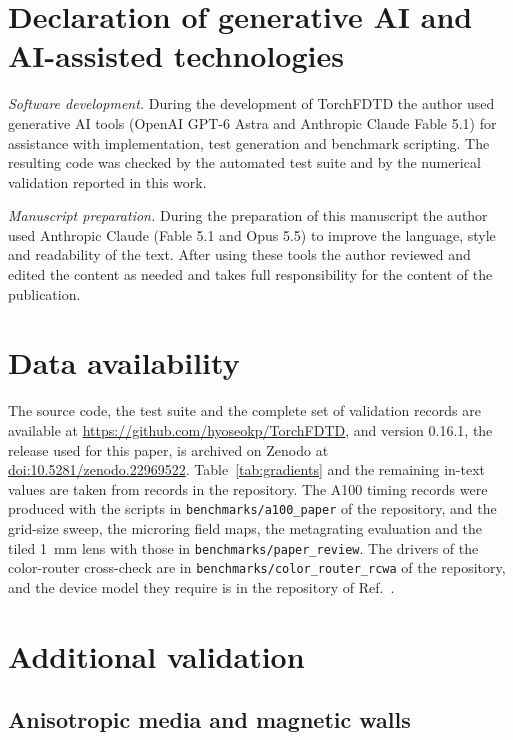 \documentclass[11pt,a4paper]{article}
\newcommand{\code}[1]{{\small\nolinkurl{#1}}}
\begin{document}
\section*{Declaration of generative AI and AI-assisted technologies}

\textit{Software development.} During the development of TorchFDTD the author used generative AI tools (OpenAI GPT-6 Astra and Anthropic Claude Fable 5.1) for assistance with implementation, test generation and benchmark scripting. The resulting code was checked by the automated test suite and by the numerical validation reported in this work.

\textit{Manuscript preparation.} During the preparation of this manuscript the author used Anthropic Claude (Fable 5.1 and Opus 5.5) to improve the language, style and readability of the text. After using these tools the author reviewed and edited the content as needed and takes full responsibility for the content of the publication.

\section*{Data availability}

The source code, the test suite and the complete set of validation records are available at \url{https://github.com/hyoseokp/TorchFDTD}, and version 0.16.1, the release used for this paper, is archived on Zenodo at \href{https://doi.org/10.5281/zenodo.22969522}{doi:10.5281/zenodo.22969522}. Table~\ref{tab:gradients} and the remaining in-text values are taken from records in the repository. The A100 timing records were produced with the scripts in \code{benchmarks/a100_paper} of the repository, and the grid-size sweep, the microring field maps, the metagrating evaluation and the tiled 1~mm lens with those in \code{benchmarks/paper_review}. The drivers of the color-router cross-check are in \code{benchmarks/color_router_rcwa} of the repository, and the device model they require is in the repository of Ref.~\citep{park2026colorrouter}.


\appendix
\section{Additional validation}
\label{app:validation}

\subsection{Anisotropic media and magnetic walls}
\end{document}
